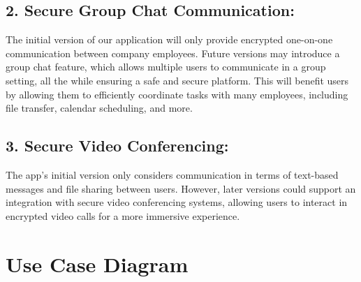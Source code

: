 \documentclass[]{article}
\begin{document}
\subsection*{2. Secure Group Chat Communication:}
The initial version of our application will only provide encrypted one-on-one communication between company employees. Future versions may introduce a group chat feature, which allows multiple users to communicate in a group setting, all the while ensuring a safe and secure platform. This will benefit users by allowing them to efficiently coordinate tasks with many employees, including file transfer, calendar scheduling, and more.

\subsection*{3. Secure Video Conferencing:}
The app’s initial version only considers communication in terms of text-based messages and file sharing between users. However, later versions could support an integration with secure video conferencing systems, allowing users to interact in encrypted video calls for a more immersive experience.

\section{Use Case Diagram}
\label{sec:use_case_diagram}
\end{document}

